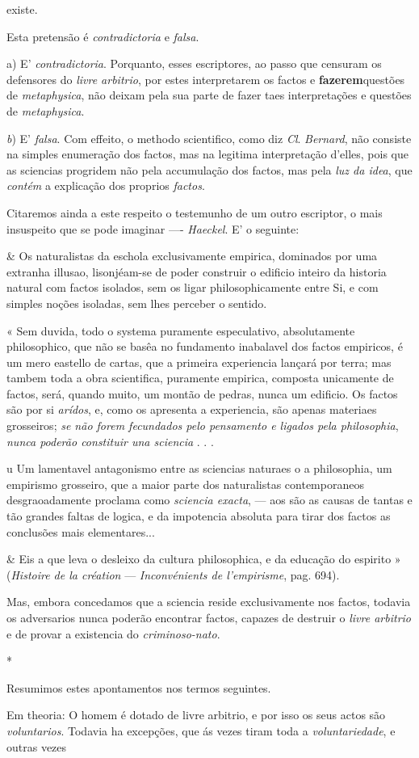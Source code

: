existe.\par Esta pretensão é \emph{contradictoria} e \emph{falsa}.\par a) E' \emph{contradictoria}. Porquanto, esses escriptores, ao passo que censuram os defensores do \emph{livre arbitrio}, por estes interpretarem os factos e \textbf{fazerem}questões de \emph{metaphysica}, não deixam pela sua parte de fazer taes interpretações e questões de \emph{metaphysica}.\par \emph{b}) E' \emph{falsa}. Com effeito, o methodo scientifico, como diz \emph{Cl}. \emph{Bernard}, não consiste na simples enumeração dos factos, mas na legitima interpretação d'elles, pois que as sciencias progridem não pela accumulação dos factos, mas pela \emph{luz da idea}, que \emph{contém} a explicação dos proprios \emph{factos}.\par Citaremos ainda a este respeito o testemunho de um outro escriptor, o mais insuspeito que se pode imaginar ---- \emph{Haeckel}. E' o seguinte:\par \& Os naturalistas da eschola exclusivamente empirica, dominados por uma extranha illusao, lisonjéam-se de poder construir o edificio inteiro da historia natural com factos isolados, sem os ligar philosophicamente entre Si, e com simples noções isoladas, sem lhes perceber o sentido.\par « Sem duvida, todo o systema puramente especulativo, absolutamente philosophico, que não se basêa no fundamento inabalavel dos factos empiricos, é um mero eastello de cartas, que a primeira experiencia lançará por terra; mas tambem toda a obra scientifica, puramente empirica, composta unicamente de factos, será, quando muito, um montão de pedras, nunca um edificio. Os factos são por si \emph{arídos}, e, como os apresenta a experiencia, são apenas materiaes grosseiros; \emph{se não forem fecundados pelo pensamento e ligados pela philosophia}, \emph{nunca poderão constituir una sciencia} . . .\par u Um lamentavel antagonismo entre as sciencias naturaes o a philosophia, um empirismo grosseiro, que a maior parte dos naturalistas contemporaneos desgraoadamente proclama como \emph{sciencia exacta}, --- aos são as causas de tantas e tão grandes faltas de logica, e da impotencia absoluta para tirar dos factos as conclusões mais elementares...\par \& Eis a que leva o desleixo da cultura philosophica, e da educação do espirito » (\emph{Histoire de la création} --- \emph{Inconvénients de l'empirisme}, pag. 694).\par Mas, embora concedamos que a sciencia reside exclusivamente nos factos, todavia os adversarios nunca poderão encontrar factos, capazes de destruir o \emph{livre arbitrio} e de provar a existencia do \emph{criminoso-nato}.\par * *\par Resumimos estes apontamentos nos termos seguintes.\par Em theoria: O homem é dotado de livre arbitrio, e por isso os seus actos são \emph{voluntarios}. Todavia ha excepções, que ás vezes tiram toda a \emph{voluntariedade}, e outras vezes 